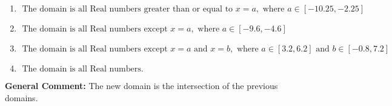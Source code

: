 \documentclass{extbook}[14pt]
\begin{document}
\begin{enumerate}
{\begin{enumerate}[label=\Alph*.]
\item \( \text{ The domain is all Real numbers greater than or equal to } x = a, \text{ where } a \in [-10.25, -2.25] \)


\item \( \text{ The domain is all Real numbers except } x = a, \text{ where } a \in [-9.6, -4.6] \)


\item \( \text{ The domain is all Real numbers except } x = a \text{ and } x = b, \text{ where } a \in [3.2, 6.2] \text{ and } b \in [-0.8, 7.2] \)


\item \( \text{ The domain is all Real numbers. } \)


\end{enumerate}

\textbf{General Comment:} The new domain is the intersection of the previous domains.
}
\end{enumerate}
\end{document}
